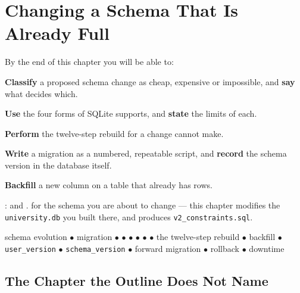 \chapter{Changing a Schema That Is Already Full}\label{ch:evolution}

\begin{outcomes}
By the end of this chapter you will be able to:
\begin{tight}
  \item \textbf{Classify} a proposed schema change as cheap, expensive or
        impossible, and \textbf{say} what decides which.
  \item \textbf{Use} the four forms of  SQLite supports, and
        \textbf{state} the limits of each.
  \item \textbf{Perform} the twelve-step rebuild for a change
         cannot make.
  \item \textbf{Write} a migration as a numbered, repeatable script, and
        \textbf{record} the schema version in the database itself.
  \item \textbf{Backfill} a new  column on a table that already
        has rows.
\end{tight}
\end{outcomes}

\begin{prereq}
:  and .  for the
schema you are about to change --- this chapter modifies the
\texttt{university.db} you built there, and produces
\texttt{v2\_constraints.sql}.
\end{prereq}

\begin{keyterms}
schema evolution $\bullet$ migration $\bullet$  $\bullet$
 $\bullet$  $\bullet$ 
$\bullet$  $\bullet$ the twelve-step rebuild $\bullet$
backfill $\bullet$  \texttt{user\_version} $\bullet$
 \texttt{schema\_version} $\bullet$ forward migration $\bullet$
rollback $\bullet$ downtime
\end{keyterms}

\section{The Chapter the Outline Does Not Name}


